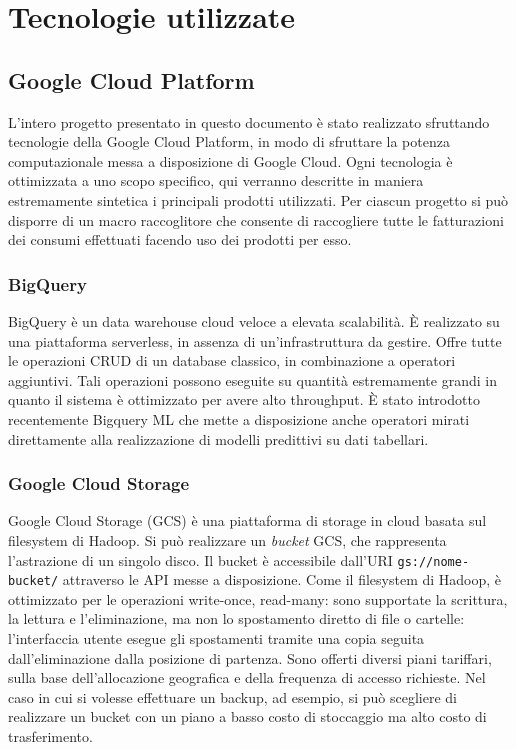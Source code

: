 \chapter{Tecnologie utilizzate}\label{appendice}
\section{Google Cloud Platform}
L'intero progetto presentato in questo documento è stato realizzato sfruttando tecnologie della Google Cloud Platform, in modo di sfruttare la potenza computazionale messa a disposizione di Google Cloud. Ogni tecnologia è ottimizzata a uno scopo specifico, qui verranno descritte in maniera estremamente sintetica i principali prodotti utilizzati. Per ciascun progetto si può disporre di un macro raccoglitore che consente di raccogliere tutte le fatturazioni dei consumi effettuati facendo uso dei prodotti per esso.
\subsection{BigQuery}\label{bigquery}
BigQuery è un data warehouse cloud veloce a elevata scalabilità. È realizzato su una piattaforma serverless, in assenza di un'infrastruttura da gestire. Offre tutte le operazioni CRUD di un database classico, in combinazione a operatori aggiuntivi. Tali operazioni possono eseguite su quantità estremamente grandi in quanto il sistema è ottimizzato per avere alto throughput. È stato introdotto recentemente Bigquery ML che mette a disposizione anche operatori mirati direttamente alla realizzazione di modelli predittivi su dati tabellari.
\subsection{Google Cloud Storage}\label{gcs}
Google Cloud Storage (GCS) è una piattaforma di storage in cloud basata sul filesystem di Hadoop. Si può realizzare un \textit{bucket} GCS, che rappresenta l'astrazione di un singolo disco. Il bucket è accessibile dall'URI \texttt{gs://nome-bucket/} attraverso le API messe a disposizione. Come il filesystem di Hadoop, è ottimizzato per le operazioni write-once, read-many: sono supportate la scrittura, la lettura e l'eliminazione, ma non lo spostamento diretto di file o cartelle: l'interfaccia utente esegue gli spostamenti tramite una copia seguita dall'eliminazione dalla posizione di partenza.
Sono offerti diversi piani tariffari, sulla base dell'allocazione geografica e della frequenza di accesso richieste. Nel caso in cui si volesse effettuare un backup, ad esempio, si può scegliere di realizzare un bucket con un piano a basso costo di stoccaggio ma alto costo di trasferimento.
